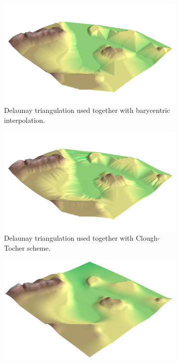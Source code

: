 \documentclass[a4paper,10pt]{report}
\begin{document}
\begin{figure}[H]
    \centering
    \begin{subfigure}{.32\textwidth}
        \includegraphics[width=\textwidth]{../images/differences/Delaunay_Triangulation_and_Barycentric_Interpolation_3D.png}
    \caption{Delaunay triangulation used together with barycentric interpolation.}
    \end{subfigure}
    \hfill
    \begin{subfigure}{.32\textwidth}
        \includegraphics[width=\textwidth]{../images/differences/Delaunay_Triangulation_and_Clough-Tocher_scheme_3D.png}
    \caption{Delaunay triangulation used together with Clough-Tocher scheme.}
    \end{subfigure}
    \hfill
    \begin{subfigure}{.32\textwidth}
        \includegraphics[width=\textwidth]{../images/differences/Radial_Basis_Thin_Plate_Spline_3D.png}

\end{subfigure}
\end{figure}
\end{document}
